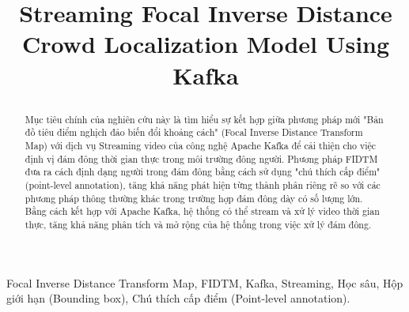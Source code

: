 \documentclass[conference]{IEEEtran}
\begin{document}
\title{Streaming Focal Inverse Distance Crowd Localization Model Using Kafka\\
{\footnotesize}

}

\makeatletter
\newcommand{\linebreakand}{%
    \end{@IEEEauthorhalign}
    \hfill\mbox{}\par
    \mbox{}\hfill\begin{@IEEEauthorhalign}
}
\makeatother

\author{
    \and
}

\maketitle
\begin{abstract}
    Mục tiêu chính của nghiên cứu này là tìm hiểu sự kết hợp giữa phương pháp mới "Bản đồ tiêu điểm nghịch đảo biến đổi khoảng cách" (Focal Inverse Distance Transform Map) với dịch vụ Streaming video của công nghệ Apache Kafka để cải thiện cho việc định vị đám đông thời gian thực trong môi trường đông người. Phương pháp FIDTM đưa ra cách định dạng người trong đám đông bằng cách sử dụng "chú thích cấp điểm" (point-level annotation), tăng khả năng phát hiện từng thành phân riêng rẽ so với các phương pháp thông thường khác trong trường hợp đám đông dày có số lượng lớn. Bằng cách kết hợp với Apache Kafka, hệ thống có thể stream và xử lý video thời gian thực, tăng khả năng phân tích và mở rộng của hệ thống trong việc xử lý đám đông.
\end{abstract}

\begin{IEEEkeywords}
    Focal Inverse Distance Transform Map, FIDTM, Kafka, Streaming, Học sâu, Hộp giới hạn (Bounding box), Chú thích cấp điểm (Point-level annotation).
\end{IEEEkeywords}
\end{document}
